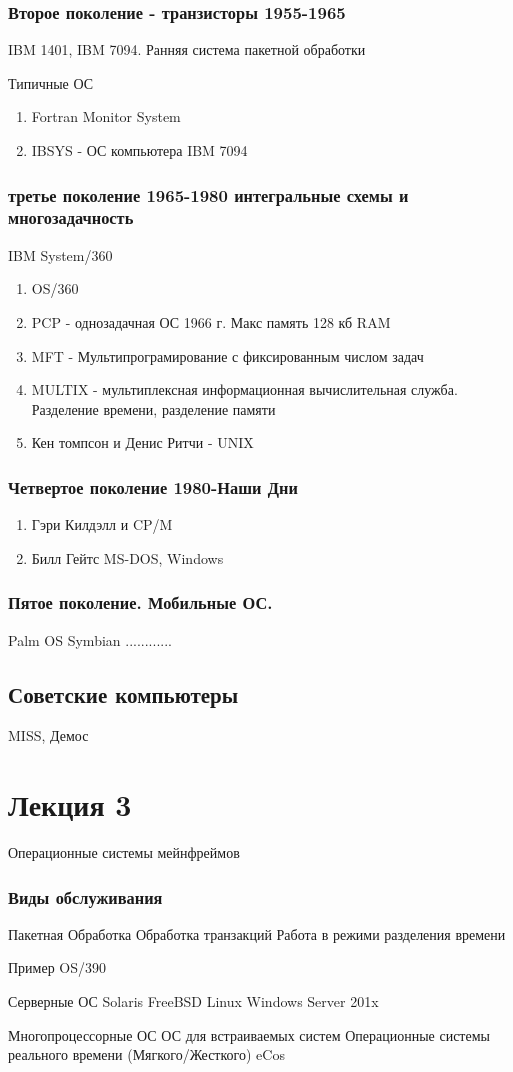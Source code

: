 \documentclass[a4paper]{article}
\begin{document}
\subsubsection{Второе поколение - транзисторы 1955-1965}
IBM 1401,
IBM 7094.
Ранняя система пакетной обработки

Типичные ОС
\begin{enumerate}
\item Fortran Monitor System
\item IBSYS - ОС компьютера IBM 7094
\end{enumerate}

\subsubsection{третье поколение 1965-1980 интегральные схемы и многозадачность}
IBM System/360

\begin{enumerate}
\item OS/360
\item PCP - однозадачная ОС 1966 г. Макс память 128 кб RAM
\item MFT - Мультипрограмирование с фиксированным числом задач
\item MULTIX - мультиплексная информационная вычислительная служба. Разделение времени, разделение памяти
\item Кен томпсон и Денис Ритчи - UNIX
\end{enumerate}

\subsubsection{Четвертое поколение 1980-Наши Дни}
\begin{enumerate}
\item Гэри Килдэлл и CP/M
\item Билл Гейтс MS-DOS, Windows
\end{enumerate}

\subsubsection{Пятое поколение. Мобильные ОС.}
Palm OS
Symbian
............

\subsection{Советские компьютеры}
MISS, Демос

\section{Лекция 3}
Операционные системы мейнфреймов
\subsubsection{Виды обслуживания}
Пакетная Обработка
Обработка транзакций
Работа в режими разделения времени

Пример OS/390

Серверные ОС
Solaris
FreeBSD
Linux
Windows Server 201x

Многопроцессорные ОС
ОС для встраиваемых систем
Операционные системы реального времени (Мягкого/Жесткого) eCos
\end{document}

